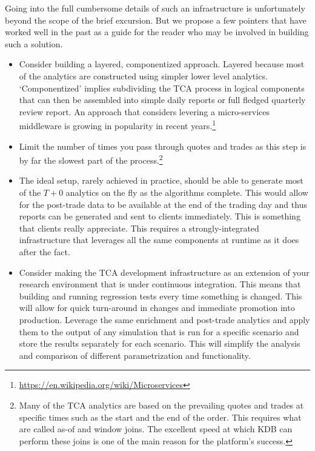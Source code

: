 Going into the full cumbersome details of such an infrastructure is unfortunately beyond the scope of the brief excursion. But we propose a few pointers that have worked well in the past as a guide for the reader who may be involved in building such a solution.

\begin{itemize}
\item Consider building a layered, componentized approach. Layered because most of the analytics are constructed using simpler lower level analytics. `Componentized' implies subdividing the TCA process in logical components that can then be assembled into simple daily reports or full fledged quarterly review report. An approach that considers levering a micro-services middleware is growing in popularity in recent years.\footnote{\url{https://en.wikipedia.org/wiki/Microservices}}

\item Limit the number of times you pass through quotes and trades as this step is by far the slowest part of the process.\footnote{Many of the TCA analytics are based on the prevailing quotes and trades at specific times such as the start and the end of the order. This requires what are called  as-of and window joins. The excellent speed at which KDB can perform these joins is one of the main reason for the platform's success.}

\item The ideal setup, rarely achieved in practice, should be able to generate most of the $T+0$ analytics on the fly as the algorithms complete. This would allow for the post-trade data to be available at the end of the trading day and thus reports can be generated and sent to clients immediately. This is something that clients really appreciate. This requires a strongly-integrated infrastructure that leverages all the same components at runtime as it does after the fact. 

\item Consider making the TCA development infrastructure as an extension of your research environment that is under continuous integration. This means that building and running regression tests every time something is changed. This will allow for quick turn-around in changes and immediate promotion into production. Leverage the same enrichment and post-trade analytics and apply them to the output of any simulation that is run for a specific scenario and store the results separately for each scenario. This will simplify the analysis and comparison of different parametrization and functionality.


\end{itemize}
